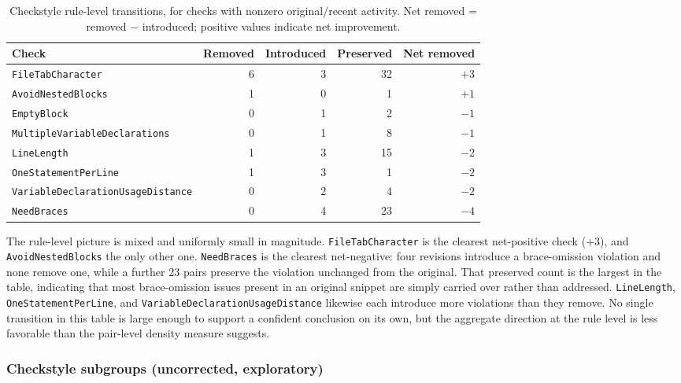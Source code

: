 \begin{table}[htbp]
\centering
\caption{Checkstyle rule-level transitions, for checks with nonzero original/recent activity.
Net removed = removed $-$ introduced; positive values indicate net improvement.}
\label{tab:or-checkstyle-rules}
\small
\begin{tabular}{lrrrr}
\toprule
Check & Removed & Introduced & Preserved & Net removed \\
\midrule
\texttt{FileTabCharacter}                  & 6 & 3 & 32 & $+3$ \\
\texttt{AvoidNestedBlocks}                 & 1 & 0 & 1  & $+1$ \\
\texttt{EmptyBlock}                        & 0 & 1 & 2  & $-1$ \\
\texttt{MultipleVariableDeclarations}      & 0 & 1 & 8  & $-1$ \\
\texttt{LineLength}                        & 1 & 3 & 15 & $-2$ \\
\texttt{OneStatementPerLine}               & 1 & 3 & 1  & $-2$ \\
\texttt{VariableDeclarationUsageDistance}  & 0 & 2 & 4  & $-2$ \\
\texttt{NeedBraces}                        & 0 & 4 & 23 & $-4$ \\
\bottomrule
\end{tabular}
\end{table}

The rule-level picture is mixed and uniformly small in magnitude.
\texttt{FileTabCharacter} is the clearest net-positive check ($+3$), and \texttt{AvoidNestedBlocks} the only other one.
\texttt{NeedBraces} is the clearest net-negative: four revisions introduce a brace-omission violation and none remove one, while a further 23 pairs preserve the violation unchanged from the original.
That preserved count is the largest in the table, indicating that most brace-omission issues present in an original snippet are simply carried over rather than addressed.
\texttt{LineLength}, \texttt{OneStatementPerLine}, and \texttt{VariableDeclarationUsageDistance} likewise each introduce more violations than they remove.
No single transition in this table is large enough to support a confident conclusion on its own, but the aggregate direction at the rule level is less favorable than the pair-level density measure suggests.

\subsubsection*{Checkstyle subgroups (uncorrected, exploratory)}

